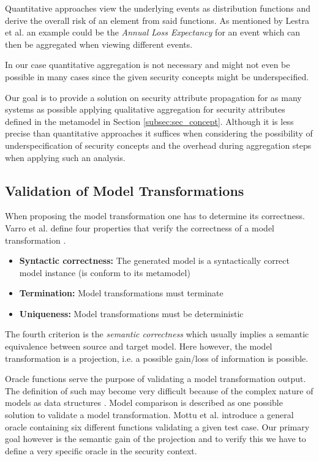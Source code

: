 Quantitative approaches view the underlying events as distribution functions and derive the overall risk of an element from said functions. As mentioned by Lestra et al. an example could be the \textit{Annual Loss Expectancy} for an event which can then be aggregated when viewing different events.

In our case quantitative aggregation is not necessary and might not even be possible in many cases since the given security concepts might be underspecified. 

Our goal is to provide a solution on security attribute propagation for as many systems as possible applying qualitative aggregation for security attributes defined in the metamodel in Section \ref{subsec:sec_concept}. Although it is less precise than quantitative approaches \cite{Lenstra2004} it suffices when considering the possibility of underspecification of security concepts and the overhead during aggregation steps when applying such an analysis.

\subsection{Validation of Model Transformations}

When proposing the model transformation one has to determine its correctness. Varro et al. define four properties that verify the correctness of a model transformation \cite{vacca2012computer}.

\begin{itemize}
\item[]\textbf{Syntactic correctness:} The generated model is a syntactically correct model instance (is conform to its metamodel)
\item[]\textbf{Termination:} Model transformations must terminate
\item[]\textbf{Uniqueness:} Model transformations must be deterministic 
\end{itemize}

The fourth criterion is the \textit{semantic correctness} which usually implies a semantic equivalence between source and target model. Here however, the model transformation is a projection, i.e. a possible gain/loss of information is possible.  

Oracle functions serve the purpose of validating a model transformation output. The definition of such may become very difficult because of the complex nature of models as data structures \cite{mottu}. Model comparison is described as one possible solution to validate a model transformation. Mottu et al. \cite{mottu} introduce a general oracle containing six different functions validating a given test case. Our primary goal however is the semantic gain of the projection and to verify this we have to define a very specific oracle in the security context. 

